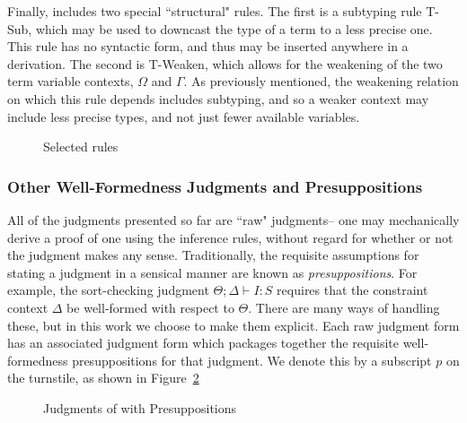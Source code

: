 Finally, \dlambdaamor includes two special ``structural" rules. The first is a subtyping rule T-Sub, which may be used to downcast the type of a term to a less precise one. This rule has no syntactic form, and thus may be inserted anywhere in a derivation. The second is T-Weaken, which allows for the weakening of the two term variable contexts, $\Omega$ and $\Gamma$. As previously mentioned, the weakening relation on which this rule depends includes subtyping, and so a weaker context may include less precise types, and not just fewer available variables.

\begin{figure}
\label{fig:dlambdaamor-selected-typing-rules}
\caption{Selected \dlambdaamor rules}
\end{figure}

\subsubsection{Other Well-Formedness Judgments and Presuppositions}
All of the judgments presented so far are ``raw" judgments-- one may mechanically derive a proof of one using the inference rules, without regard for whether or not the judgment makes any sense. Traditionally, the requisite assumptions for stating a judgment in a sensical manner are known as \textit{presuppositions}. For example, the sort-checking judgment $\Theta ; \Delta \vdash I : S$ requires that the constraint context $\Delta$ be well-formed with respect to $\Theta$. There are many ways of handling these, but in this work we choose to make them explicit. Each raw judgment form has an associated judgment form which packages together the requisite well-formedness presuppositions for that judgment. We denote this by a subscript $p$ on the turnstile, as shown in Figure~\ref{fig:dlambdaamor-presupps}

\begin{figure}
\label{fig:dlambdaamor-presupps}
\caption{Judgments of \dlambdaamor with Presuppositions}
\end{figure}

